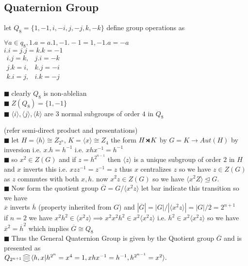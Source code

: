 \documentclass[11pt]{extarticle}
\newcommand{\ra}{\rightarrow}
\newcommand{\y}{$\blacksquare\;$}
\newcommand{\smdp}{ \,
\begin{tikzpicture}
	\draw[thick] (0,0)--(1ex,1ex)--(1ex,0)--(0,1ex);
\end{tikzpicture} 
\,
}
\newcommand{\gen}[1]{\langle #1 \rangle}
\newcommand{\pst}{ \,\rotatebox[origin=c]{90}{$ \gen{||} $} \,}
\newcommand{\tbx}[2][]{
	\begin{tcolorbox}[enhanced,breakable,size=small,colback=black!2!white,title={#1},arc is angular, arc=1.5mm,drop fuzzy shadow]
		#2
	\end{tcolorbox}
}
\begin{document}
\begin{multicols}{2}
	\subsection{Quaternion Group}
\tbx{ let $ Q_8=\{1,-1,i,-i,j,-j,k,-k\} $ define group operations as
	
	\begin{center}

	$ \forall a\in q_8,1.a=a.1,-1.-1=1,-1.a=-a $ \\
	$ i.i=j.j=k.k=-1 $ \\
	$ \begin{matrix}
		i.j=k,& j.i=-k\\
		j.k=i,& k.j=-i\\
		k.i=j,& i.k=-j
	\end{matrix} $  
		
\end{center}
}
\tbx{ 
\y clearly $ Q_8 $ is non-ablelian\\
\y $ Z(Q_8)=\{1,-1\} $ \\
 \y $\gen{i},\gen{j},\gen{k}$ are 3 normal subgroups of order $ 4 $ in $ Q_8 $ }
 \tbx[Generalised Quaternion Group ]{ (refer semi-direct product and presentations)\\
 \y let $ H=\gen{h}\cong Z_{2^n} $, $ K=\gen{x}\cong Z_4 $  the form $ H\smdp K $ by $ G= K\ra Aut(H) $ by inversion i.e. $ x.h=h^{-1} $ i.e. $ xhx^{-1}=h^{-1} $ \\
\y so $ x^2\in  Z(G) $  and if $ z=h^{2^{n-1}} $ then $ \gen{z} $ is a unique subgroup of order $ 2 $ in $ H $ and $ x $ inverts this i.e. $ xzz^{-1}=z^{-1}=z $ thus $ x $ centralizes $ z $ so we have $ z\in Z(G) $ as $ z $ commutes with both $ x,h $. now $ x^2z\in Z(G) $ so we have $ \gen{x^2Z}\trianglelefteq G $.\\
 \y Now form the quotient group $ \overline{G}=G/\gen{x^2z}$ let bar indicate this transition so we have\\
 $ \overline{x} $ inverts $ \overline{h} $ (property inherited from $ G $) and $ |\overline{G}|=|G|/|\gen{x^2z}|=|G|/2=2^{n+1} $ \\
 if $ n=2 $ we have $ {x}^2{h}^{2}\in \gen{x^2z}\implies {x}^2{x}^2{h}^{2}\in x^2\gen{x^2z}$ i.e. $ h^2 \in x^2\gen{x^2z}$ so we have $ \overline{x}^2=\overline{h}^2 $ which implies $ \overline{G}\cong Q_8 $ \\
\y Thus the General Quaternion Group is given by the Quotient group $\overline{G}$ and is presented as 
\\ $ Q_{2^{n+1}} \pst \gen{ h,x |h^{2^n}=x^4=1,xhx^{-1}=h^{-1},h^{2^{n-1}}=x^2}.$ 
  } 

\end{multicols}
\end{document}
